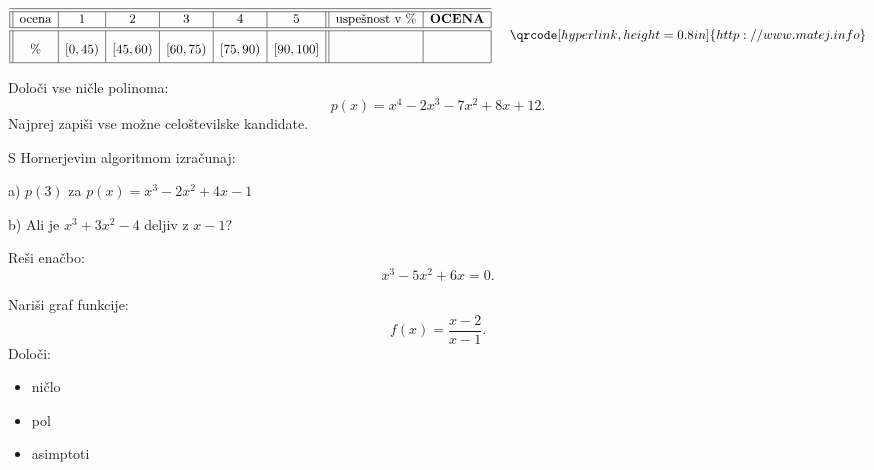 \documentclass[a4paper,12pt]{letter}
\newcounter{tocke}
\begin{document}
\vfill
{}
\begin{kriterij*}
 $$
 \begin{array}{||c|c|c|c|c|c||
>{}c|c|}
 \hline\hline
 \textup{ocena}& 1&2&3&4&5&\textrm{uspe\v{s}nost v } \%& \textrm{\bf OCENA}\\
  \hline\hline
 \% & [0,45) &[45,60)&[60,75
 ) &[75,90)    &    [90,100]& \mbox{\phantom{ \huge{$\frac{5}{445}$
 15}}
 } 
 & \\
 \hline
 \end{array} \hspace*{0.5cm}\vspace*{-0.3cm} \qrcode[hyperlink,height=0.8in]{http://www.matej.info}
$$
\vspace*{0.1cm}
\end{kriterij*}
\newpage


\def\tockeC{5}
\begin{naloga}[\hfill $\tockeC$] \addtocounter{tocke}{\tockeC}
Določi vse ničle polinoma:
\[
p(x)=x^4-2x^3-7x^2+8x+12.
\]
Najprej zapiši vse možne celoštevilske kandidate.
\end{naloga}

\vspace{8cm}

\def\tockeD{3+3}
\begin{naloga}[\hfill $\tockeD$] \addtocounter{tocke}{\tockeD}
S Hornerjevim algoritmom izračunaj:

a) $p(3)$ za $p(x)=x^3-2x^2+4x-1$

b) Ali je $x^3+3x^2-4$ deljiv z $x-1$?
\end{naloga}

\newpage


\def\tockeE{4}
\begin{naloga}[\hfill $\tockeE$] \addtocounter{tocke}{\tockeE}
Reši enačbo:
\[
x^3-5x^2+6x=0.
\]
\end{naloga}

\vspace{10cm}




\def\tockeG{6}
\begin{naloga}[\hfill $\tockeG$] \addtocounter{tocke}{\tockeG}
Nariši graf funkcije:
\[
f(x)=\frac{x-2}{x-1}.
\]
Določi:
\begin{itemize}
\item ničlo
\item pol
\item asimptoti
\end{itemize}
\end{naloga}
\end{document}
